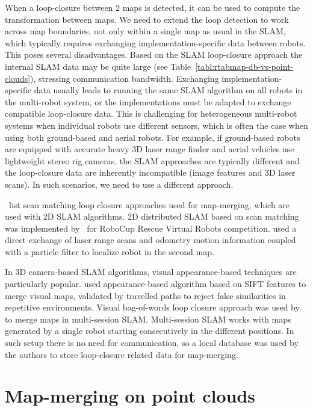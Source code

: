 When a loop-closure between 2 maps is detected, it can be used to compute the transformation between maps. We need to extend the loop detection to work across map boundaries, not only within a single map as usual in the \gls{SLAM}, which typically requires exchanging implementation-specific data between robots. This poses several disadvantages. Based on the \gls{SLAM} loop-closure approach the internal \gls{SLAM} data may be quite large (see Table~\ref{tabl:rtabmap-db-vs-point-clouds}), stressing communication bandwidth. Exchanging implementation-specific data usually leads to running the same \gls{SLAM} algorithm on all robots in the multi-robot system, or the implementations must be adapted to exchange compatible loop-closure data. This is challenging for heterogeneous multi-robot systems when individual robots use different sensors, which is often the case when using both ground-based and aerial robots. For example, if ground-based robots are equipped with accurate heavy \gls{3D} laser range finder and aerial vehicles use lightweight stereo rig cameras, the \gls{SLAM} approaches are typically different and the loop-closure data are inherently incompatible (image features and \gls{3D} laser scans). In such scenarios, we need to use a different approach.

\citet{lee2012survey}~list scan matching loop closure approaches used for map-merging, which are used with \gls{2D} \gls{SLAM} algorithms. \gls{2D} distributed \gls{SLAM} based on scan matching was implemented by~\citet{pfingsthorn2007scalable} for RoboCup Rescue Virtual Robots competition. \citet{fox2006distributed} used a direct exchange of laser range scans and odometry motion information coupled with a particle filter to localize robot in the second map.

In \gls{3D} camera-based \gls{SLAM} algorithms, visual appearance-based techniques are particularly popular. \citet{tomono2013merging} used appearance-based algorithm based on \gls{SIFT} features to merge visual maps, validated by travelled paths to reject false similarities in repetitive environments. Visual bag-of-words loop closure approach was used by~\citet{labbe2014online} to merge maps in multi-session \gls{SLAM}. Multi-session \gls{SLAM} works with maps generated by a single robot starting consecutively in the different positions. In such setup there is no need for communication, so a local database was used by the authors to store loop-closure related data for map-merging.

\section{Map-merging on point clouds}
\label{sec:map-merging-on-point-clouds}

